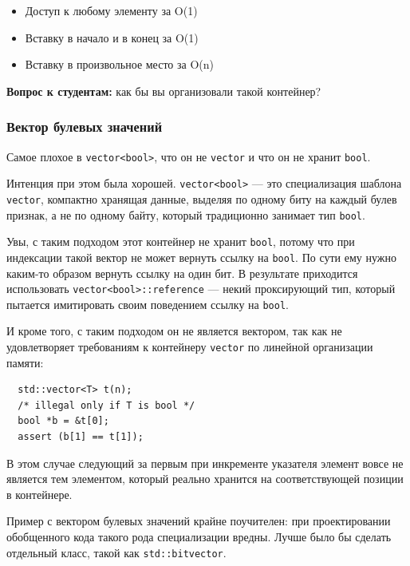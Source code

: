\documentclass[a4paper,12pt,oneside]{article}
\newif\ifanswers
\begin{document}
\begin{itemize}
\item Доступ к любому элементу за O(1) 
\item Вставку в начало и в конец за O(1) 
\item Вставку в произвольное место за O(n)
\end{itemize}

\textbf{Вопрос к студентам:} как бы вы организовали такой контейнер?

\ifanswers
Правильный ответ: последовательность кусков памяти фиксированного размера, связанных в цепочку
\fi

\subsubsection{Вектор булевых значений}

Самое плохое в \lstinline!vector<bool>!, что он не \lstinline!vector! и что он не хранит \lstinline!bool!.

Интенция при этом была хорошей. \lstinline!vector<bool>! — это специализация шаблона \lstinline!vector!, компактно хранящая данные, выделяя по одному биту на каждый булев признак, а не по одному байту, который традиционно занимает тип \lstinline!bool!.

Увы, с таким подходом этот контейнер не хранит \lstinline!bool!, потому что при индексации такой вектор не может вернуть ссылку на \lstinline!bool!. По сути ему нужно каким-то образом вернуть ссылку на один бит. В результате приходится использовать \lstinline!vector<bool>::reference! — некий проксирующий тип, который пытается имитировать своим поведением ссылку на \lstinline!bool!.

И кроме того, с таким подходом он не является вектором, так как не удовлетворяет требованиям к контейнеру \lstinline!vector! по линейной организации памяти:

\begin{lstlisting}
  std::vector<T> t(n);
  /* illegal only if T is bool */
  bool *b = &t[0];
  assert (b[1] == t[1]);
\end{lstlisting}

В этом случае следующий за первым при инкременте указателя элемент вовсе не является тем элементом, который реально хранится на соответствующей позиции в контейнере.

Пример с вектором булевых значений крайне поучителен: при проектировании обобщенного кода такого рода специализации вредны. Лучше было бы сделать отдельный класс, такой как \lstinline!std::bitvector!.
\end{document}

